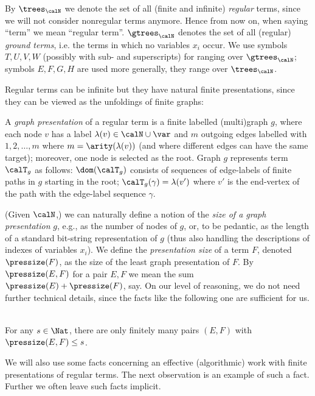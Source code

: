 \documentclass[12pt]{article}
\begin{document}
By $\trees_{\calN}$ we denote the set of all
(finite and infinite) \emph{regular} terms, since we will not consider
nonregular terms anymore.
Hence from now on, when saying ``term'' we mean ``regular term''. 
$\gtrees_{\calN}$ denotes the set of all (regular)
\emph{ground terms}, i.e. the terms  in which no  variables $x_i$
occur.
We use symbols $T,U,V,W$ (possibly with sub- and
superscripts) for ranging over $\gtrees_{\calN}$;
symbols $E,F,G,H$ 
are used more generally, they range over $\trees_{\calN}$.





Regular terms can be infinite but they have natural finite
presentations, since they can be viewed as the unfoldings of finite
graphs: 

\begin{defn}
A \emph{graph presentation} of a regular term is 
a finite labelled (multi)graph $g$, where each node $v$ has a label
$\lambda(v)\in\calN\cup\var$ and  $m$ outgoing edges
labelled with $1,2,\dots,m$ where $m=\arity(\lambda(v))$ 
(and where different edges can have the same target); 
moreover, one node is selected  as the root. 
Graph $g$ represents term $\calT_g$ as follows:  $\dom(\calT_g)$
consists of sequences of edge-labels of
finite paths in $g$  starting in the root; 
$\calT_g(\gamma)=\lambda(v')$
where $v'$ is the end-vertex of the path with the edge-label sequence
$\gamma$.
\end{defn}
(Given $\calN$,) 
we can naturally define a notion of the \emph{size of a graph
presentation} $g$, e.g., as the number of nodes of $g$, or, to be
pedantic, as the length of a standard bit-string representation of $g$
(thus also handling the descriptions of indexes of variables $x_i$).
We define the
\emph{presentation size} of a term $F$, denoted 
$\pressize(F)$, as the size of the least graph
presentation of $F$. 
By $\pressize(E,F)$ for a pair $E,F$ we mean the sum 
$\pressize(E)+\pressize(F)$, say. 
On our level of reasoning, we do not need further technical details,
since the facts like the following one are sufficient for us.

\begin{observ}\label{prop:boundpressize}\hfill
\\
For any $s\in\Nat$, there are only finitely many pairs $(E,F)$ with
$\pressize(E,F)\leq s$.
\end{observ}
We will also use some facts concerning an effective (algorithmic)
work with finite
presentations of regular terms. The next observation is an example of
such a fact. Further we often leave such facts implicit.
\end{document}
